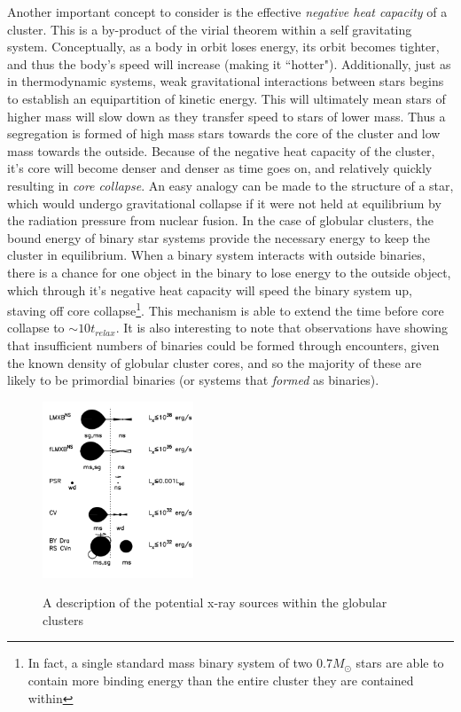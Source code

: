 \documentclass[aps,
                pra,  
                a4paper, 
                amsmath, 
                amssymb, 
                preprint,
                tightenlines,  
                amsfonts,
                nofootinbib,
                notitlepage
            ]{revtex4-2}
\begin{document}
Another important concept to consider is the effective \textit{negative heat capacity} of a cluster. This is a by-product of the virial theorem within a self gravitating system. Conceptually, as a body in orbit loses energy, its orbit becomes tighter, and thus the body's speed will increase (making it ``hotter"). Additionally, just as in thermodynamic systems, weak gravitational interactions between stars begins to establish an equipartition of kinetic energy. This will ultimately mean stars of higher mass will slow down as they transfer speed to stars of lower mass. Thus a segregation is formed of high mass stars towards the core of the cluster and low mass towards the outside. Because of the negative heat capacity of the cluster, it's core will become denser and denser as time goes on, and relatively quickly resulting in \textit{core collapse}. An easy analogy can be made to the structure of a star, which would undergo gravitational collapse if it were not held at equilibrium by the radiation pressure from nuclear fusion. In the case of globular clusters, the bound energy of binary star systems provide the necessary energy to keep the cluster in equilibrium. When a binary system interacts with outside binaries, there is a chance for one object in the binary to lose energy to the outside object, which through it's negative heat capacity will speed the binary system up, staving off core collapse\footnote{In fact, a single standard mass binary system of two $0.7M_{\odot}$ stars are able to contain more binding energy than the entire cluster they are contained within}. This mechanism is able to extend the time before core collapse to $\sim 10t_{relax}$. It is also interesting to note that observations have showing that insufficient numbers of binaries could be formed through encounters, given the known density of globular cluster cores, and so the majority of these are likely to be primordial binaries (or systems that \textit{formed} as binaries).
\par
\begin{figure}
    \caption{A description of the potential x-ray sources within the globular clusters\cite{Verbunt2004}}
    \includegraphics[width=0.4\textwidth]{img/gc-xray-sources.png}
    \label{fig:gc-xray-sources}
\end{figure}
\end{document}
